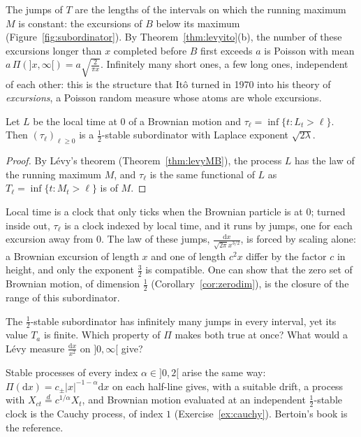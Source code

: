The jumps of $T$ are the lengths of the intervals on which the running maximum $M$ is constant: the excursions of $B$ below its maximum (Figure~\ref{fig:subordinator}). By Theorem~\ref{thm:levyito}(b), the number of
these excursions longer than $x$ completed before $B$ first exceeds $a$ is Poisson with mean $a\,\Pi(]x,\infty[)=a\sqrt{\frac2{\pi x}}$. Infinitely many short ones, a few long ones, independent of each other: this is the
structure that It\^o turned in 1970 into his theory of \emph{excursions}, a Poisson random measure whose atoms are whole excursions.

\begin{corollary}\label{cor:invlocal}
Let $L$ be the local time at $0$ of a Brownian motion and $\tau_\ell=\inf\{t:L_t>\ell\}$. Then $(\tau_\ell)_{\ell\ge0}$ is a $\frac12$-stable subordinator with Laplace exponent $\sqrt{2\lambda}$.
\end{corollary}

\begin{proof}
By L\'evy's theorem (Theorem~\ref{thm:levyMB}), the process $L$ has the law of the running maximum $M$, and $\tau_\ell$ is the same functional of $L$ as $T_\ell=\inf\{t:M_t>\ell\}$ is of $M$.
\end{proof}

\begin{beauty}
Local time is a clock that only ticks when the Brownian particle is at $0$; turned inside out, $\tau_\ell$ is a clock indexed by local time, and it runs by jumps, one for each excursion away from $0$. The law of
these jumps, $\frac{\mathrm dx}{\sqrt{2\pi}x^{3/2}}$, is forced by scaling alone: a Brownian excursion of length $x$ and one of length $c^2x$ differ by the factor $c$ in height, and only the exponent $\frac32$ is compatible.
One can show that the zero set of Brownian motion, of dimension $\frac12$ (Corollary~\ref{cor:zerodim}), is the closure of the range of this subordinator.
\end{beauty}

\begin{think}
The $\frac12$-stable subordinator has infinitely many jumps in every interval, yet its value $T_a$ is finite. Which property of $\Pi$ makes both true at once? What would a L\'evy measure $\frac{\mathrm dx}{x^2}$ on $]0,\infty[$
give?
\end{think}

\begin{remark}
Stable processes of every index $\alpha\in]0,2[$ arise the same way: $\Pi(\mathrm dx)=c_\pm|x|^{-1-\alpha}\mathrm dx$ on each half-line gives, with a suitable drift, a process with $X_{ct}\overset{d}=c^{1/\alpha}X_t$, and Brownian motion evaluated at
an independent $\frac12$-stable clock is the Cauchy process, of index $1$ (Exercise~\ref{ex:cauchy}). Bertoin's book is the reference.
\end{remark}

